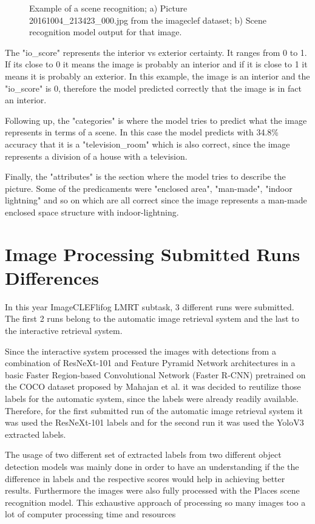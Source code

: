 \begin{figure}[H]
    \caption{Example of a scene recognition; a) Picture 20161004\_213423\_000.jpg from the imageclef dataset; b) Scene recognition model output for that image.}

    \label{fig:imagea}
    \end{figure}


    The "io\_score" represents the interior vs exterior certainty. It ranges from 0 to 1. If its close to 0 it means the image is probably an interior and if it is close to 1 it means it is probably an exterior. In this example, the image is an interior and the "io\_score" is 0, therefore the model predicted correctly that the image is in fact an interior.

    Following up, the "categories" is where the model tries to predict what the image represents in terms of a scene. In this case the model predicts with 34.8\% accuracy that it is a "television\_room" which is also correct, since the image represents a division of a house with a television.

    Finally, the "attributes" is the section where the model tries to describe the picture. Some of the predicaments were "enclosed area", "man-made", "indoor lightning" and so on which are all correct since the image represents a man-made enclosed space structure with indoor-lightning.

\section{Image Processing Submitted Runs Differences}
\label{sec:runs}


    In this year ImageCLEFlifog LMRT subtask, 3 different runs were submitted. The first 2 runs belong to the automatic image retrieval system and the last to the interactive retrieval system. 
    
    Since the interactive system processed the images with detections from a combination of ResNeXt-101 and Feature Pyramid Network architectures in a basic Faster Region-based Convolutional Network (Faster R-CNN) pretrained on the COCO dataset proposed by Mahajan et al. \cite{Mahajan2018} it was decided to reutilize those labels for the automatic system, since the labels were already readily available.  Therefore, for the first submitted run of the automatic image retrieval system it was used the ResNeXt-101 labels and for the second run it was used the YoloV3 \cite{Redmon2018} extracted labels.
    
    The usage of two different set of extracted labels from two different object detection models was mainly done in order to have an understanding if the the difference in labels and the respective scores would help in achieving better results. Furthermore the images were also fully processed with the Places scene recognition model. This exhaustive approach of processing so many images too a  lot of computer processing time and resources


